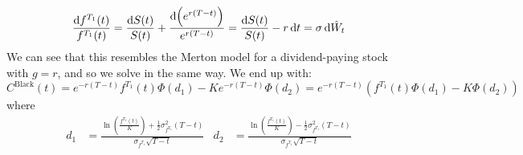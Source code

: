 \documentclass[11pt]{article}
\begin{document}
$$ \frac{\dif f^{T_1}(t)}{f^{T_1}(t)} = \frac{\dif S(t)}{S(t)} + \frac{\dif  \left(e^{r(T-t)}\right)}{e^{r(T-t)}} = \frac{\dif S(t)}{S(t)} - r \dif t = \sigma \dif\hat{W}_t$$
We can see that this resembles the Merton model for a dividend-paying stock with $g = r$, and so we solve in the same way. We end up with:
$$C^{\text{Black}}(t) = e^{-r(T-t)}f^{T_1}(t)\Phi(d_1) - Ke^{-r(T-t)}\Phi(d_2) = e^{-r(T-t)}\left(f^{T_1}(t)\Phi(d_1) - K\Phi(d_2)\right)$$
where
\begin{align*}
d_1 &= \frac{\ln \left( \frac{f^{T_1}(t)}{K}\right) + \frac{1}{2}\sigma^2_{f^{T_1}}(T-t)}{\sigma_{f^{T_1}} \sqrt{T-t}} &
d_2 &= \frac{\ln \left( \frac{f^{T_1}(t)}{K}\right) - \frac{1}{2}\sigma^2_{f^{T_1}}(T-t)}{\sigma_{f^{T_1}} \sqrt{T-t}}
\end{align*}
\end{document}

